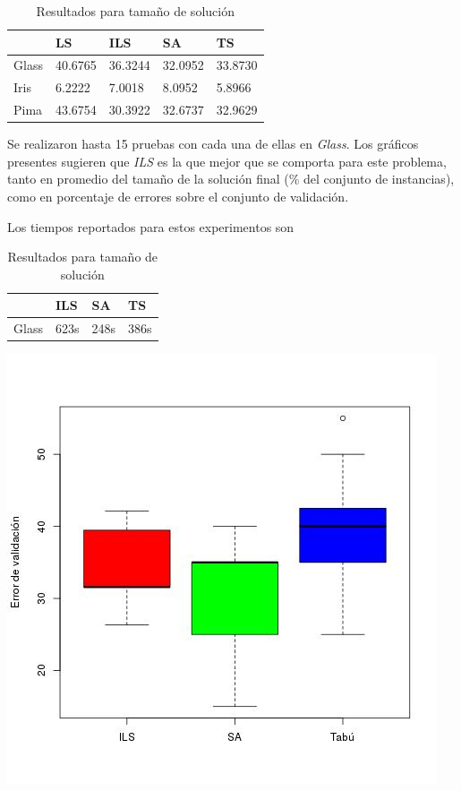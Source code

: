 \documentclass[11pt]{article}
\begin{document}
\begin{table}[h]
\begin{tabular}{ |l|l|l|l|l| }
    \hline
     & LS & ILS & SA & TS  \\ \hline
    Glass & 40.6765 & 36.3244    & 32.0952 & 33.8730 \\ \hline
    Iris  & 6.2222 & 7.0018     & 8.0952  & 5.8966 \\ \hline
    Pima  & 43.6754 & 30.3922 & 32.6737       & 32.9629 \\ \hline
\end{tabular}
\caption{Resultados para tamaño de solución}
\label{tabla:2}
\end{table}


Se realizaron 
hasta 15 pruebas con cada una de ellas en \emph{Glass}. Los gráficos 
presentes sugieren que \emph{ILS} es la que mejor que se comporta para este problema, 
tanto en promedio del tamaño de la solución final (\% del conjunto de instancias), 
como en porcentaje de errores sobre el conjunto de validación.

Los tiempos reportados para estos experimentos son

\begin{table}[h]
\begin{tabular}{ |l|l|l|l| }
    \hline
     & ILS & SA & TS  \\ \hline
    Glass & 623s & 248s & 386s \\ \hline
\end{tabular}
\caption{Resultados para tamaño de solución}
\label{tabla:2}
\end{table}


\begin{center}
  \includegraphics[scale=0.4]{val_errors.jpeg}~\\[1cm]
\end{center}
\end{document}
